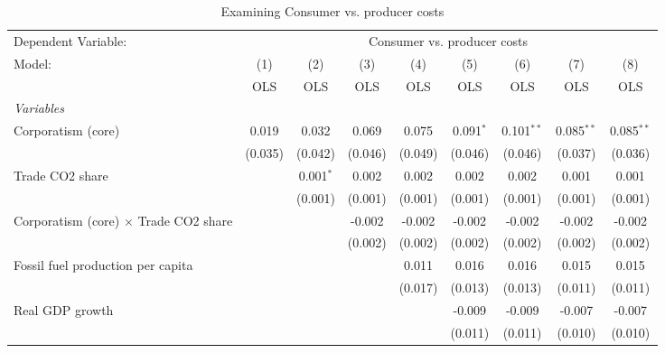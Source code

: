 
\begin{table}[htbp]
   \caption{Examining Consumer vs. producer costs}
   \centering
   \begin{tabular}{lcccccccc}
      \toprule
      Dependent Variable: & \multicolumn{8}{c}{Consumer vs. producer costs}\\
      Model:                                       & (1)     & (2)         & (3)     & (4)     & (5)         & (6)          & (7)          & (8)\\  
                                                   &  OLS    & OLS         & OLS     & OLS     & OLS         & OLS          & OLS          & OLS\\  
      \midrule
      \emph{Variables}\\
      Corporatism (core)                           & 0.019   & 0.032       & 0.069   & 0.075   & 0.091$^{*}$ & 0.101$^{**}$ & 0.085$^{**}$ & 0.085$^{**}$\\   
                                                   & (0.035) & (0.042)     & (0.046) & (0.049) & (0.046)     & (0.046)      & (0.037)      & (0.036)\\   
      Trade CO2 share                              &         & 0.001$^{*}$ & 0.002   & 0.002   & 0.002       & 0.002        & 0.001        & 0.001\\   
                                                   &         & (0.001)     & (0.001) & (0.001) & (0.001)     & (0.001)      & (0.001)      & (0.001)\\   
      Corporatism (core) $\times$ Trade CO2 share  &         &             & -0.002  & -0.002  & -0.002      & -0.002       & -0.002       & -0.002\\   
                                                   &         &             & (0.002) & (0.002) & (0.002)     & (0.002)      & (0.002)      & (0.002)\\   
      Fossil fuel production per capita            &         &             &         & 0.011   & 0.016       & 0.016        & 0.015        & 0.015\\   
                                                   &         &             &         & (0.017) & (0.013)     & (0.013)      & (0.011)      & (0.011)\\   
      Real GDP growth                              &         &             &         &         & -0.009      & -0.009       & -0.007       & -0.007\\   
                                                   &         &             &         &         & (0.011)     & (0.011)      & (0.010)      & (0.010)\\   

\end{tabular}
\end{table}
